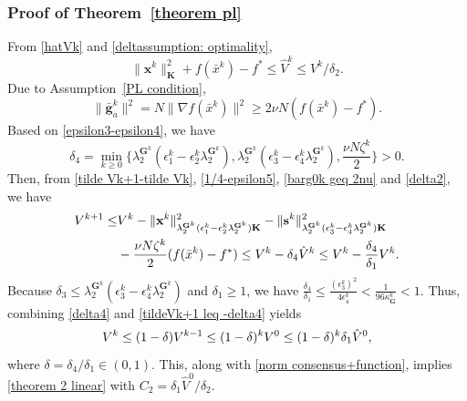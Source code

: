 \documentclass[12pt,draftcls,onecolumn]{IEEEtran}
\newcommand{\bG}{{\mathbf{G}}}
\begin{document}
\subsubsection{Proof of Theorem~\ref{theorem pl}}\label{proof theorem pl}
From \eqref{hatVk} and \eqref{deltassumption: optimality},
\begin{equation}
	\|\mathbf{x}^k\|^2_{\mathbf{K}} + f(\bar{x}^k) - f^* \leq \hat{V}^k \leq {V^k}/{{\delta_2}}.\label{norm consensus+function}
\end{equation}
Due to Assumption~\ref{PL condition},
\begin{equation}
	\|\bar{\mathbf{g}}_a^k\|^2 = N\|\nabla f(\bar{x}^k)\|^2 \geq 2\nu N(f(\bar{x}^k) - f^*).\label{barg0k geq 2nu}
\end{equation}
Based on \eqref{epsilon3-epsilon4}, we have
\begin{equation}
	\delta_4 = \min_{k\geq 0} \{\lambda_{2}^{\mathbf{G}^k}({\epsilon_1^k} -  {\epsilon_2^k}\lambda_{2}^{\mathbf{G}^k}),\lambda_{2}^{\mathbf{G}^k}({\epsilon_3^k} - \epsilon_4^k\lambda_{2}^{\mathbf{G}^k}), \frac{\nu N{\zeta^k}}{2}\} > 0. \label{delta4}
\end{equation}
Then, from \eqref{tilde Vk+1-tilde Vk}, \eqref{1/4-epsilon5}, \eqref{barg0k geq 2nu} and \eqref{delta2}, we have
\begin{align}
	V^{k+1} \leq&  V^k- \|\mathbf{x}^k\|^2_{\lambda_{2}^{\mathbf{G}^k} ({\epsilon_1^k} - {\epsilon_2^k} \lambda_{2}^{\mathbf{G}^k})\mathbf{K} } - \|\mathbf{s}^k\|^2_{  \lambda_{2}^{\mathbf{G}^k}({\epsilon_3^k} - \epsilon_4^k \lambda_{2}^{\mathbf{G}^k})\mathbf{K} }\notag\\
	& - \frac{\nu N {\zeta^k}}{2} (f(\bar{x}^k) - f^*) \leq V^{k} - \delta_4 \hat{V}^k\leq V^k - \frac{\delta_4}{{\delta_1}}V^k.
	\label{tildeVk+1 leq -delta4}
\end{align}
Because $\delta_3 \leq \lambda_{2}^{\mathbf{G}^k}({\epsilon_3^k} - \epsilon_4^k \lambda_{2}^{\mathbf{G}^k})$ and $\delta_1\geq 1$, we have $\frac{\delta_4}{{\delta_1}}\leq \frac{(\epsilon_3^k)^2}{4\epsilon_4^k}<\frac{1}{96\kappa_\bG^k}<1$. Thus, combining \eqref{delta4} and \eqref{tildeVk+1 leq -delta4} yields
\vspace{-0.2cm}
\begin{equation}
	V^{k} \leq (1-\delta) V^{k-1} \leq (1-\delta)^{k} V^0 \leq (1-\delta)^{k} {\delta_1} \hat{V}^0, \notag
\end{equation}
where $\delta = \delta_4/\delta_1\in(0,1)$. This, along with \eqref{norm consensus+function}, implies \eqref{theorem 2 linear} with $C_2=\delta_1\hat{V}^0/\delta_2$.
\end{document}
